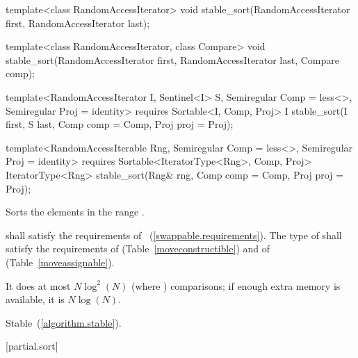 %
\begin{removedblock}
\begin{itemdecl}
template<class RandomAccessIterator>
  void stable_sort(RandomAccessIterator first, RandomAccessIterator last);

template<class RandomAccessIterator, class Compare>
  void stable_sort(RandomAccessIterator first, RandomAccessIterator last,
                   Compare comp);
\end{itemdecl}
\end{removedblock}
\begin{addedblock}
\begin{itemdecl}
template<RandomAccessIterator I, Sentinel<I> S, Semiregular Comp = less<>,
    Semiregular Proj = identity>
  requires Sortable<I, Comp, Proj>
  I stable_sort(I first, S last, Comp comp = Comp{}, Proj proj = Proj{});

template<RandomAccessIterable Rng, Semiregular Comp = less<>, Semiregular Proj = identity>
  requires Sortable<IteratorType<Rng>, Comp, Proj>
  IteratorType<Rng>
    stable_sort(Rng& rng, Comp comp = Comp{}, Proj proj = Proj{});
\end{itemdecl}
\end{addedblock}

\begin{itemdescr}
\pnum
\effects
Sorts the elements in the range .

\begin{removedblock}
\pnum
\requires
{} shall satisfy the requirements of
~(\ref{swappable.requirements}). The type
of  shall satisfy the requirements of
 (Table~\ref{moveconstructible}) and of
 (Table~\ref{moveassignable}).
\end{removedblock}

\pnum
\complexity
It does at most $N \log^2(N)$
(where
)
comparisons; if enough extra memory is available, it is
$N \log(N)$.

\pnum
\remarks Stable~(\ref{algorithm.stable}).
\end{itemdescr}

[partial.sort]{}

